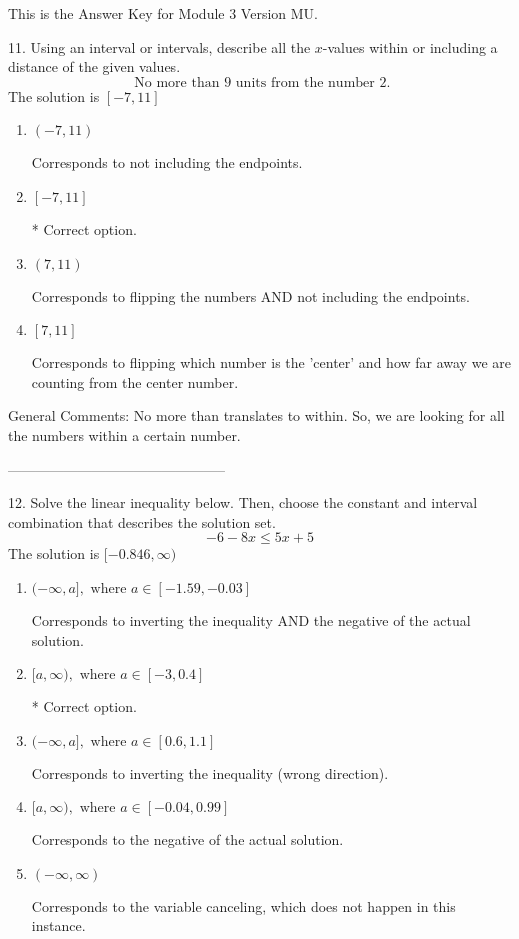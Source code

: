 \documentclass{article}[10pt]
\begin{document}
This is the Answer Key for Module 3 Version MU.

11. Using an interval or intervals, describe all the $x$-values within or including a distance of the given values.
$$ \text{ No more than } 9 \text{ units from the number } 2. $$ 
The solution is $ [-7, 11] $ 

\begin{enumerate}[label=\Alph*.] 
\item $ (-7, 11) $ 

 Corresponds to not including the endpoints. 
\item $ [-7, 11] $ 

 * Correct option. 
\item $ (7, 11) $ 

 Corresponds to flipping the numbers AND not including the endpoints. 
\item $ [7, 11] $ 

 Corresponds to flipping which number is the 'center' and how far away we are counting from the center number. 
\end{enumerate} 
 
General Comments: No more than translates to within. So, we are looking for all the numbers within a certain number.

-----------------------------------------------

12. Solve the linear inequality below. Then, choose the constant and interval combination that describes the solution set.
$$ -6 - 8 x \leq 5 x + 5 $$ 
The solution is $ [-0.846, \infty) $ 

\begin{enumerate}[label=\Alph*.] 
\item $ (-\infty, a], \text{ where } a \in [-1.59, -0.03] $ 

 Corresponds to inverting the inequality AND the negative of the actual solution. 
\item $ [a, \infty), \text{ where } a \in [-3, 0.4] $ 

  * Correct option. 
\item $ (-\infty, a], \text{ where } a \in [0.6, 1.1] $ 

 Corresponds to inverting the inequality (wrong direction). 
\item $ [a, \infty), \text{ where } a \in [-0.04, 0.99] $ 

 Corresponds to the negative of the actual solution. 
\item $ (-\infty, \infty) $ 

 Corresponds to the variable canceling, which does not happen in this instance. 
\end{enumerate} 
 
\end{document}

